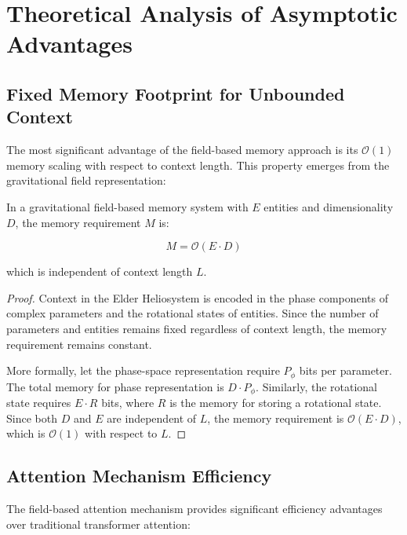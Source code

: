 \section{Theoretical Analysis of Asymptotic Advantages}

\subsection{Fixed Memory Footprint for Unbounded Context}

The most significant advantage of the field-based memory approach is its $\mathcal{O}(1)$ memory scaling with respect to context length. This property emerges from the gravitational field representation:

\begin{theorem}
In a gravitational field-based memory system with $E$ entities and dimensionality $D$, the memory requirement $M$ is:

\begin{equation}
M = \mathcal{O}(E \cdot D)
\end{equation}

which is independent of context length $L$.
\end{theorem}

\begin{proof}
Context in the Elder Heliosystem is encoded in the phase components of complex parameters and the rotational states of entities. Since the number of parameters and entities remains fixed regardless of context length, the memory requirement remains constant.

More formally, let the phase-space representation require $P_{\phi}$ bits per parameter. The total memory for phase representation is $D \cdot P_{\phi}$. Similarly, the rotational state requires $E \cdot R$ bits, where $R$ is the memory for storing a rotational state. Since both $D$ and $E$ are independent of $L$, the memory requirement is $\mathcal{O}(E \cdot D)$, which is $\mathcal{O}(1)$ with respect to $L$.
\end{proof}

\subsection{Attention Mechanism Efficiency}

The field-based attention mechanism provides significant efficiency advantages over traditional transformer attention:

